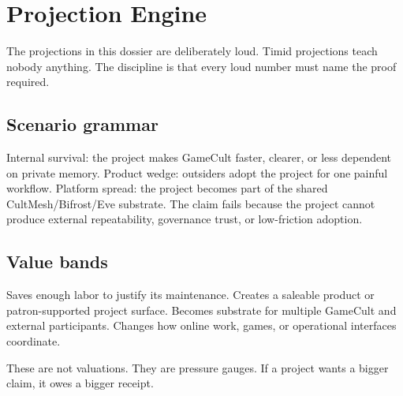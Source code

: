 \chapter{Projection Engine}

The projections in this dossier are deliberately loud. Timid projections teach nobody anything. The discipline is that every loud number must name the proof required.

\section{Scenario grammar}

\ProjectionBand
{Internal survival: the project makes GameCult faster, clearer, or less dependent on private memory.}
{Product wedge: outsiders adopt the project for one painful workflow.}
{Platform spread: the project becomes part of the shared CultMesh/Bifrost/Eve substrate.}
{The claim fails because the project cannot produce external repeatability, governance trust, or low-friction adoption.}

\section{Value bands}

\ValueLadder
{Saves enough labor to justify its maintenance.}
{Creates a saleable product or patron-supported project surface.}
{Becomes substrate for multiple GameCult and external participants.}
{Changes how online work, games, or operational interfaces coordinate.}

These are not valuations. They are pressure gauges. If a project wants a bigger claim, it owes a bigger receipt.
